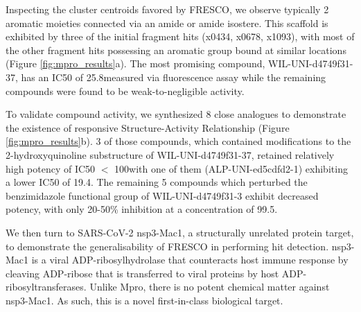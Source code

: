 
Inspecting the cluster centroids favored by FRESCO, we observe typically 2 aromatic moieties connected via an amide or amide isostere. This scaffold is exhibited by three of the initial fragment hits (x0434, x0678, x1093), with most of the other fragment hits possessing an aromatic group bound at similar locations (Figure \ref{fig:mpro_results}a). The most promising compound, WIL-UNI-d4749f31-37, has an IC50 of 25.8\uM measured via fluorescence assay while the remaining compounds were found to be weak-to-negligible activity.

To validate compound activity, we synthesized 8 close analogues to demonstrate the existence of responsive Structure-Activity Relationship \cite{Hermann2013ZincImpurity, Morreale2017ZincImpurity} (Figure \ref{fig:mpro_results}b). 3 of those compounds, which contained modifications to the 2-hydroxyquinoline substructure of WIL-UNI-d4749f31-37, retained relatively high potency of IC50 $<$ 100\uM with one of them (ALP-UNI-ed5cdfd2-1) exhibiting a lower IC50 of 19.4\uM. The remaining 5 compounds which perturbed the benzimidazole functional group of WIL-UNI-d4749f31-3 exhibit decreased potency, with only 20-50\% inhibition at a concentration of 99.5\uM.


We then turn to SARS-CoV-2 nsp3-Mac1, a structurally unrelated protein target, to demonstrate the generalisability of FRESCO in performing hit detection. nsp3-Mac1 is a viral ADP-ribosylhydrolase that counteracts host immune response by cleaving ADP-ribose that is transferred to viral proteins by host ADP-ribosyltransferases. Unlike Mpro, there is no potent chemical matter against nsp3-Mac1. As such, this is a novel first-in-class biological target. 

